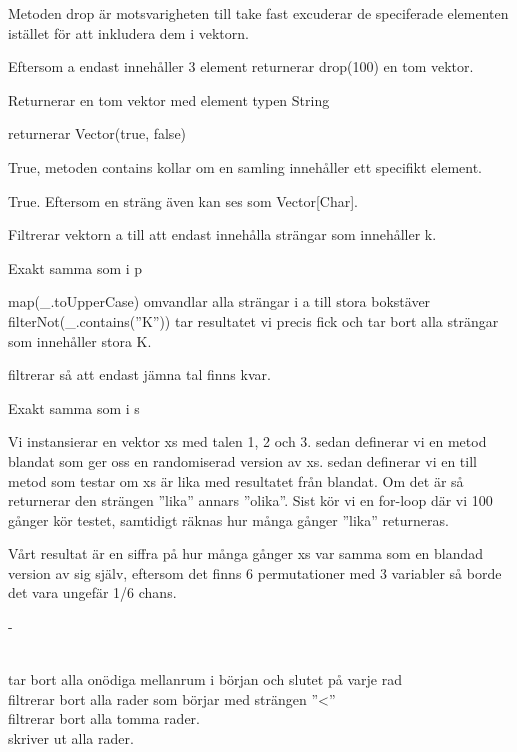 \Subtask 
Metoden drop är motsvarigheten till take fast excuderar de speciferade elementen istället för att inkludera dem i vektorn.

\Subtask 
Eftersom a endast innehåller 3 element returnerar drop(100) en tom vektor.

\Subtask 
Returnerar en tom vektor med element typen String

\Subtask 
returnerar Vector(true, false) 

\Subtask 
True, metoden contains kollar om en samling innehåller ett specifikt element.

\Subtask 
True. Eftersom en sträng även kan ses som Vector[Char].

\Subtask 
Filtrerar vektorn a till att endast innehålla strängar som innehåller k.

\Subtask 
Exakt samma som i p

\Subtask 
map(\_.toUpperCase) omvandlar alla strängar i a till stora bokstäver
filterNot(\_.contains(''K'')) tar resultatet vi precis fick och tar bort alla strängar som innehåller stora K.

\Subtask 
filtrerar så att endast jämna tal finns kvar.

\Subtask 
Exakt samma som i s



\Task %

\Subtask 
Vi instansierar en vektor xs med talen 1, 2 och 3.
sedan definerar vi en metod blandat som ger oss en randomiserad version av xs.
sedan definerar vi en till metod som testar om xs är lika med resultatet från blandat. Om det är så returnerar den strängen ''lika'' annars ''olika''.
Sist kör vi en for-loop där vi 100 gånger kör testet, samtidigt räknas hur många gånger ''lika'' returneras.

Vårt resultat är en siffra på hur många gånger xs var samma som en blandad version av sig själv, eftersom det finns 6 permutationer med 3 variabler så borde det vara ungefär 1/6 chans.

\Subtask -

\Subtask 
\\  tar bort alla onödiga mellanrum i början och slutet på varje rad
\\  filtrerar bort alla rader som börjar med strängen ''<''
\\  filtrerar bort alla tomma rader.
\\  skriver ut alla rader.

